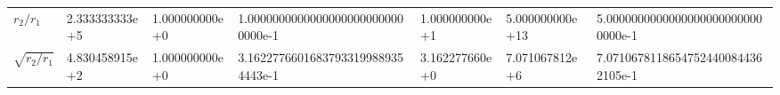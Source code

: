 \begin{table}[ht]
\begin{tabular}{@{} l l l l l l l @{}}
$r_2/r_1$ & {\ttfamily 2.333333333e+5} & {\ttfamily 1.000000000e+0} & {\ttfamily 1.00000000000000000000000000000e-1} & {\ttfamily 1.000000000e+1} & {\ttfamily 5.000000000e+13} & {\ttfamily 5.00000000000000000000000000000e-1} \\
$\sqrt{r_2/r_1}$ & {\ttfamily 4.830458915e+2} & {\ttfamily 1.000000000e+0} & {\ttfamily 3.16227766016837933199889354443e-1} & {\ttfamily 3.162277660e+0} & {\ttfamily 7.071067812e+6} & {\ttfamily 7.07106781186547524400844362105e-1} \\
\bottomrule
\end{tabular}
\end{table}
